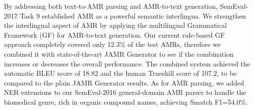 By addressing both text-to-AMR parsing and AMR-to-text generation, SemEval-2017 Task 9 established AMR as a powerful semantic interlingua. We strengthen the interlingual aspect of AMR by applying the multilingual Grammatical Framework (GF) for AMR-to-text generation. Our current rule-based GF approach completely covered only 12.3\% of the test AMRs, therefore we combined it with state-of-the-art JAMR Generator to see if the combination increases or decreases the overall performance. The combined system achieved the automatic BLEU score of 18.82 and the human Trueskill score of 107.2, to be compared to the plain JAMR Generator results. As for AMR parsing, we added NER extensions to our SemEval-2016 general-domain AMR parser to handle the biomedical genre, rich in organic compound names, achieving Smatch F1=54.0\%.

